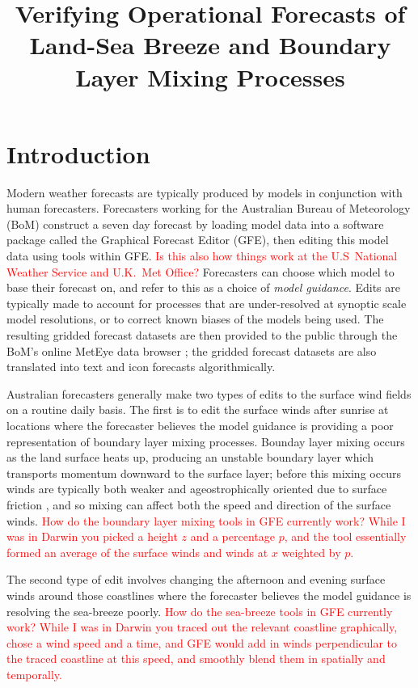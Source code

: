 \documentclass{ametsoc}
\title{Verifying Operational Forecasts of Land-Sea Breeze and Boundary Layer Mixing Processes}
\affiliation{School of Earth Sciences, and ARC Centre of Excellence for Climate Extremes, The University of Melbourne, Melbourne, Victoria, Australia.}
\begin{document}
\maketitle

\section{Introduction}
\label{Sec:Introduction}
Modern weather forecasts are typically produced by models in conjunction with human forecasters. Forecasters working for the Australian Bureau of Meteorology (BoM) construct a seven day forecast by loading model data into a software package called the Graphical Forecast Editor (GFE), then editing this model data using tools within GFE. \textcolor{red}{Is this also how things work at the U.S~National Weather Service and U.K.~Met Office?} Forecasters can choose which model to base their forecast on, and refer to this as a choice of \textit{model guidance}. Edits are typically made to account for processes that are under-resolved at synoptic scale model resolutions, or to correct known biases of the models being used. The resulting gridded forecast datasets are then provided to the public through the BoM's online MetEye data browser \citep{bomMetEye19}; the gridded forecast datasets are also translated into text and icon forecasts algorithmically.  

Australian forecasters generally make two types of edits to the surface wind fields on a routine daily basis. The first is to edit the surface winds after sunrise at locations where the forecaster believes the model guidance is providing a poor representation of boundary layer mixing processes. Bounday layer mixing occurs as the land surface heats up, producing an unstable boundary layer which transports momentum downward to the surface layer; before this mixing occurs winds are typically both weaker and ageostrophically oriented due to surface friction \citep{lee18}, and so mixing can affect both the speed and direction of the surface winds. \textcolor{red}{How do the boundary layer mixing tools in GFE currently work? While I was in Darwin you picked a height $z$ and a percentage $p$, and the tool essentially formed an average of the surface winds and winds at $x$ weighted by $p$.}

The second type of edit involves changing the afternoon and evening surface winds around those coastlines where the forecaster believes the model guidance is resolving the sea-breeze poorly. \textcolor{red}{How do the sea-breeze tools in GFE currently work? While I was in Darwin you traced out the relevant coastline graphically, chose a wind speed and a time, and GFE would add in winds perpendicular to the traced coastline at this speed, and smoothly blend them in spatially and temporally.} 
\end{document}

